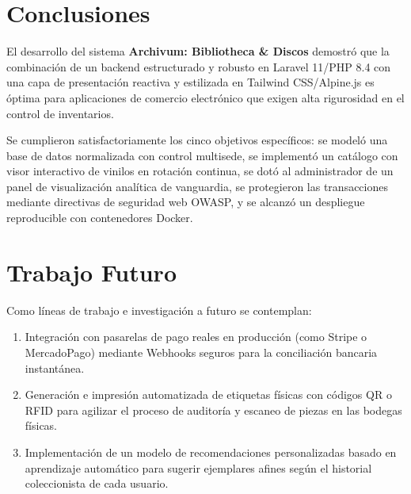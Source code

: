 \section{Conclusiones}
El desarrollo del sistema \textbf{Archivum: Bibliotheca \& Discos} demostró que la combinación de un backend estructurado y robusto en Laravel 11/PHP 8.4 con una capa de presentación reactiva y estilizada en Tailwind CSS/Alpine.js es óptima para aplicaciones de comercio electrónico que exigen alta rigurosidad en el control de inventarios.

Se cumplieron satisfactoriamente los cinco objetivos específicos: se modeló una base de datos normalizada con control multisede, se implementó un catálogo con visor interactivo de vinilos en rotación continua, se dotó al administrador de un panel de visualización analítica de vanguardia, se protegieron las transacciones mediante directivas de seguridad web OWASP, y se alcanzó un despliegue reproducible con contenedores Docker.

\section{Trabajo Futuro}
Como líneas de trabajo e investigación a futuro se contemplan:
\begin{enumerate}
    \item Integración con pasarelas de pago reales en producción (como Stripe o MercadoPago) mediante Webhooks seguros para la conciliación bancaria instantánea.
    \item Generación e impresión automatizada de etiquetas físicas con códigos QR o RFID para agilizar el proceso de auditoría y escaneo de piezas en las bodegas físicas.
    \item Implementación de un modelo de recomendaciones personalizadas basado en aprendizaje automático para sugerir ejemplares afines según el historial coleccionista de cada usuario.
\end{enumerate}
